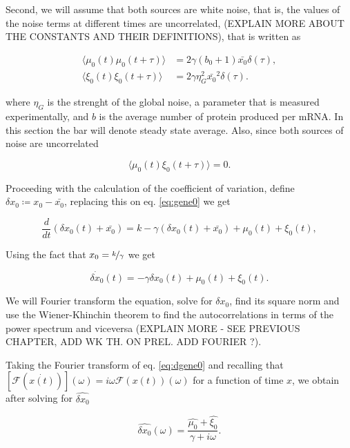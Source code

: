 Second, we will assume that both sources are white noise, that is, the values of the noise terms at different times are uncorrelated, (EXPLAIN MORE ABOUT THE CONSTANTS AND THEIR DEFINITIONS), that is written as

\begin{align}
\langle\mu_0(t)\mu_0(t+\tau)\rangle&=2\gamma(b_0+1)\bar{x_0}\delta(\tau),\label{eq:corin0}\\
\langle\xi_0(t)\xi_0(t+\tau)\rangle&=2\gamma\eta_G^2\bar{x_0}^2\delta(\tau). \label{eq:corex0}
\end{align}

where $\eta_G$ is the strenght of the global noise, a parameter that is measured experimentally, and $b$ is the average number of protein produced per mRNA. In this section the bar will denote steady state average. Also, since both sources of noise are uncorrelated

\begin{equation}
\label{eq:corinex0}
\langle\mu_0(t)\xi_0(t+\tau)\rangle = 0.
\end{equation}

Proceeding with the calculation of the coefficient of variation, define $\delta x_0 \coloneqq x_0 - \bar{x_0}$, replacing this on eq. \ref{eq:gene0} we get

\begin{equation}
\frac{d}{dt}\left(\delta x_0(t) + \bar{x_0}\right) = k - \gamma (\delta x_0(t) + \bar{x_0}) + \mu_0(t) + \xi_0(t),
\end{equation}

Using the fact that $x_0=\nicefrac{k}{\gamma}$ we get

\begin{equation}
\label{eq:dgene0}
\dot{\delta x_0}(t) = -\gamma \delta x_0(t) + \mu_0(t) + \xi_0(t).
\end{equation}

We will Fourier transform the equation, solve for $\delta x_0$, find its square norm and use the Wiener-Khinchin theorem to find the autocorrelations in terms of the power spectrum and viceversa (EXPLAIN MORE - SEE PREVIOUS CHAPTER, ADD WK TH. ON PREL. ADD FOURIER ?).

Taking the Fourier transform of eq. \ref{eq:dgene0} and recalling that $[\mathscr{F}(\dot{x(t)})](\omega) = i\omega \mathscr{F}(x(t))(\omega)$ for a function of time $x$, we obtain after solving for $\hat{\delta x_0}$

\begin{equation}
\label{eq:fgene0}
\hat{\delta x_0}(\omega) = \frac{\hat{\mu_0}+\hat{\xi_0}}{\gamma + i\omega}.
\end{equation}

